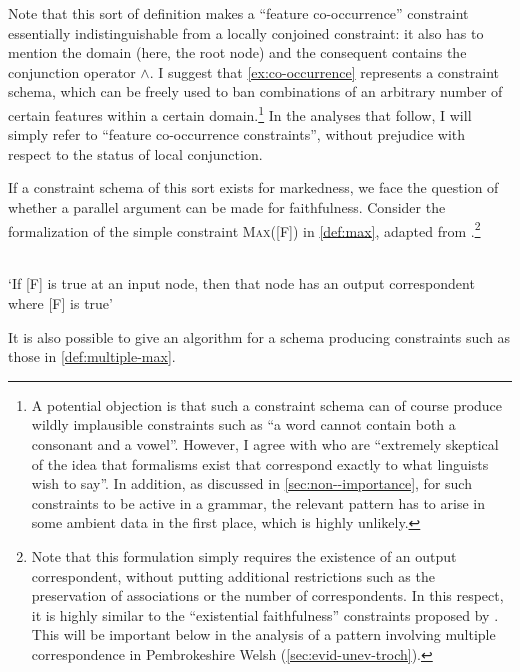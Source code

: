 Note that this sort of definition makes a \enquote{feature co\hyp occurrence} constraint essentially indistinguishable from a locally conjoined constraint: it also has to mention the domain (here, the root node) and the consequent contains the conjunction operator $\wedge$. I suggest that \cref{ex:co-occurrence} represents a constraint schema, which can be freely used to ban combinations of an arbitrary number of certain features within a certain domain.\footnote{A potential objection is that such a constraint schema can of course produce wildly implausible constraints such as \enquote{a word cannot contain both a consonant and a vowel}. However, I agree with \citet[footnote 12]{potts02:_model_ot} who are \enquote{extremely skeptical of the idea that formalisms exist that correspond exactly to what linguists wish to say}. In addition, as discussed in \cref{sec:non--importance}, for such constraints to be active in a grammar, the relevant pattern has to arise in some ambient data in the first place, which is highly unlikely.} In the analyses that follow, I will simply refer to \enquote{feature co\hyp occurrence constraints}, without prejudice with respect to the status of local conjunction.

If a constraint schema of this sort exists for markedness, we face the question of whether a parallel argument can be made for faithfulness. Consider the formalization of the simple constraint \textsc{Max}([F]) in \cref{def:max}, adapted from \citet{potts02:_model_ot}.\footnote{Note that this formulation simply requires the existence of an output correspondent, without putting additional restrictions such as the preservation of associations or the number of correspondents. In this respect, it is highly similar to the \enquote{existential faithfulness} constraints proposed by \citet{struijke00:_exist}. This will be important below in the analysis of a pattern involving multiple correspondence in Pembrokeshire Welsh (\cref{sec:evid-unev-troch}).}

\begin{constraint}
  \label{def:max}
  \\
  `If [F] is true at an input node, then that node has an output correspondent where [F] is true'
\end{constraint}

It is also possible to give an algorithm for a schema producing constraints such as those in \cref{def:multiple-max}.

